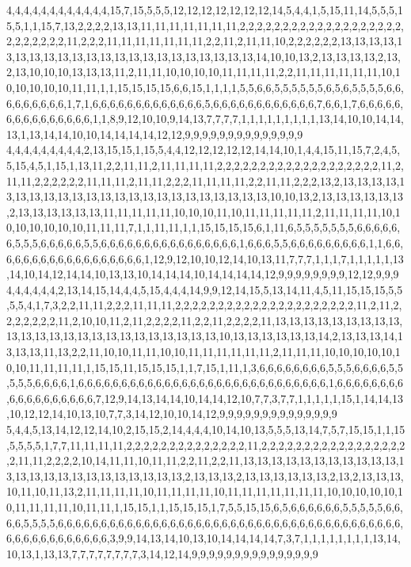 4,4,4,4,4,4,4,4,4,4,4,4,15,7,15,5,5,5,12,12,12,12,12,12,12,14,5,4,4,1,5,15,11,14,5,5,5,15,5,1,1,15,7,13,2,2,2,2,13,13,11,11,11,11,11,11,11,2,2,2,2,2,2,2,2,2,2,2,2,2,2,2,2,2,2,2,2,2,2,2,2,2,2,11,2,2,2,11,11,11,11,11,11,11,2,2,11,2,11,11,10,2,2,2,2,2,2,13,13,13,13,13,13,13,13,13,13,13,13,13,13,13,13,13,13,13,13,13,13,14,10,10,13,2,13,13,13,13,2,13,2,13,10,10,10,13,13,13,11,2,11,11,10,10,10,10,11,11,11,11,2,2,11,11,11,11,11,11,10,10,10,10,10,10,11,11,1,1,15,15,15,15,6,6,15,1,1,1,1,5,5,6,6,5,5,5,5,5,5,6,5,6,5,5,5,5,6,6,6,6,6,6,6,6,6,1,7,1,6,6,6,6,6,6,6,6,6,6,6,6,6,5,6,6,6,6,6,6,6,6,6,6,6,6,7,6,6,1,7,6,6,6,6,6,6,6,6,6,6,6,6,6,6,6,1,1,8,9,12,10,10,9,14,13,7,7,7,7,1,1,1,1,1,1,1,1,1,13,14,10,10,14,14,13,1,13,14,14,10,10,14,14,14,14,12,12,9,9,9,9,9,9,9,9,9,9,9,9,9,9
4,4,4,4,4,4,4,4,4,2,13,15,15,1,15,5,4,4,12,12,12,12,12,14,14,10,1,4,4,15,11,15,7,2,4,5,5,15,4,5,1,15,1,13,11,2,2,11,11,2,11,11,11,11,2,2,2,2,2,2,2,2,2,2,2,2,2,2,2,2,2,2,2,11,2,11,11,2,2,2,2,2,2,11,11,11,2,11,11,2,2,2,11,11,11,11,2,2,11,11,2,2,2,13,2,13,13,13,13,13,13,13,13,13,13,13,13,13,13,13,13,13,13,13,13,13,13,13,10,10,13,2,13,13,13,13,13,13,2,13,13,13,13,13,13,11,11,11,11,11,10,10,10,11,10,11,11,11,11,11,2,11,11,11,11,10,10,10,10,10,10,10,11,11,11,7,1,1,11,11,1,1,15,15,15,15,6,1,11,6,5,5,5,5,5,5,5,6,6,6,6,6,6,5,5,5,6,6,6,6,6,5,5,6,6,6,6,6,6,6,6,6,6,6,6,6,6,6,6,1,6,6,6,5,5,6,6,6,6,6,6,6,6,6,1,1,6,6,6,6,6,6,6,6,6,6,6,6,6,6,6,6,6,6,1,12,9,12,10,10,12,14,10,13,11,7,7,7,1,1,1,7,1,1,1,1,1,13,14,10,14,12,14,14,10,13,13,10,14,14,14,10,14,14,14,14,12,9,9,9,9,9,9,9,9,12,12,9,9,9
4,4,4,4,4,4,2,13,14,15,14,4,4,5,15,4,4,4,14,9,9,12,14,15,5,13,14,11,4,5,11,15,15,15,5,5,5,5,4,1,7,3,2,2,11,11,2,2,2,11,11,11,2,2,2,2,2,2,2,2,2,2,2,2,2,2,2,2,2,2,2,2,2,11,2,11,2,2,2,2,2,2,2,11,2,10,10,11,2,11,2,2,2,2,11,2,2,11,2,2,2,2,11,13,13,13,13,13,13,13,13,13,13,13,13,13,13,13,13,13,13,13,13,13,13,13,13,10,13,13,13,13,13,13,14,2,13,13,13,14,13,13,13,11,13,2,2,11,10,10,11,11,10,10,11,11,11,11,11,11,2,11,11,11,10,10,10,10,10,10,10,11,11,11,11,1,15,15,11,15,15,15,1,1,7,15,1,11,1,3,6,6,6,6,6,6,6,6,5,5,5,6,6,6,6,5,5,5,5,5,6,6,6,6,1,6,6,6,6,6,6,6,6,6,6,6,6,6,6,6,6,6,6,6,6,6,6,6,6,6,6,6,6,6,1,6,6,6,6,6,6,6,6,6,6,6,6,6,6,6,6,6,6,7,12,9,14,13,14,14,10,14,14,12,10,7,7,3,7,7,1,1,1,1,1,15,1,14,14,13,10,12,12,14,10,13,10,7,7,3,14,12,10,10,14,12,9,9,9,9,9,9,9,9,9,9,9,9,9,9
5,4,4,5,13,14,12,12,14,10,2,15,15,2,14,4,4,4,10,14,10,13,5,5,5,13,14,7,5,7,15,15,1,1,15,5,5,5,5,1,7,7,11,11,11,11,2,2,2,2,2,2,2,2,2,2,2,2,2,2,11,2,2,2,2,2,2,2,2,2,2,2,2,2,2,2,2,2,2,11,11,2,2,2,2,10,14,11,11,10,11,11,2,2,11,2,2,11,13,13,13,13,13,13,13,13,13,13,13,13,13,13,13,13,13,13,13,13,13,13,13,13,2,13,13,13,2,13,13,13,13,13,13,2,13,2,13,13,13,10,11,10,11,13,2,11,11,11,11,10,11,11,11,11,10,11,11,11,11,11,11,11,10,10,10,10,10,10,11,11,11,11,10,11,11,1,15,15,1,1,15,15,15,1,7,5,5,15,15,6,5,6,6,6,6,6,6,5,5,5,5,5,6,6,6,6,5,5,5,5,6,6,6,6,6,6,6,6,6,6,6,6,6,6,6,6,6,6,6,6,6,6,6,6,6,6,6,6,6,6,6,6,6,6,6,6,6,6,6,6,6,6,6,6,6,6,6,6,6,6,6,6,3,9,9,14,13,14,10,13,10,14,14,14,14,7,3,7,1,1,1,1,1,1,1,1,13,14,10,13,1,13,13,7,7,7,7,7,7,7,7,3,14,12,14,9,9,9,9,9,9,9,9,9,9,9,9,9,9,9
